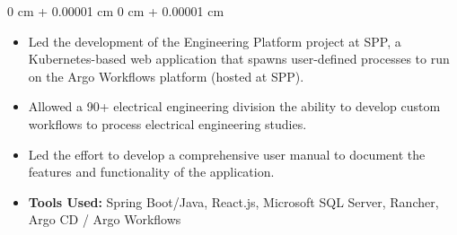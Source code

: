 \documentclass[10pt, letterpaper]{article}
\newenvironment{highlights}{
    \begin{itemize}[
        topsep=0.10 cm,
        parsep=0.10 cm,
        partopsep=0pt,
        itemsep=0pt,
        leftmargin=0 cm + 10pt
    ]
}{
    \end{itemize}
} %
\newenvironment{onecolentry}{
    \begin{adjustwidth}{
        0 cm + 0.00001 cm
    }{
        0 cm + 0.00001 cm
    }
}{
    \end{adjustwidth}
} %
\newenvironment{twocolentry}[2][]{
    \onecolentry
    \def\secondColumn{#2}
    \setcolumnwidth{\fill, 4.5 cm}
    \begin{paracol}{2}
}{
    \switchcolumn \raggedleft \secondColumn
    \end{paracol}
    \endonecolentry
} %
\begin{document}
        \vspace{0.10 cm}
        \begin{onecolentry}
            \begin{highlights}
                \item Led the development of the Engineering Platform project at SPP, a Kubernetes-based web application that spawns user-defined processes to run on the Argo Workflows platform (hosted at SPP).
                \item Allowed a 90+ electrical engineering division the ability to develop custom workflows to process electrical engineering studies.
                \item Led the effort to develop a comprehensive user manual to document the features and functionality of the application.
                \item \textbf{Tools Used:} Spring Boot/Java, React.js, Microsoft SQL Server, Rancher, Argo CD / Argo Workflows
            \end{highlights}
        \end{onecolentry}



%
%
%
%
%
\end{document}
